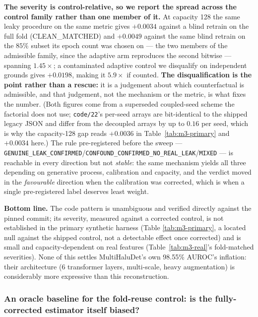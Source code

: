 \documentclass[10pt]{article} %
\begin{document}
\textbf{The severity is control-relative, so we report the spread across the
control family rather than one member of it.} At capacity 128 the same leaky
procedure on the same metric gives $+0.0034$ against a blind retrain on the
full fold (CLEAN\_MATCHED) and $+0.0049$ against the same blind retrain on the
$85\%$ subset its epoch count was chosen on --- the two members of the
admissible family, since the adaptive arm reproduces the second bitwise ---
spanning $1.45\times$; a contaminated adaptive control we disqualify on
independent grounds gives $+0.0198$, making it $5.9\times$ if counted.
\textbf{The disqualification is the point rather than a rescue:} it is a
judgement about which counterfactual is admissible, and that judgement, not the
mechanism or the metric, is what fixes the number. (Both figures come from a
superseded coupled-seed scheme the factorial does not use; \texttt{code/22}'s
per-seed arrays are bit-identical to the shipped legacy JSON and differ from
the decoupled arrays by up to $0.16$ per seed, which is why the capacity-128
gap reads $+0.0036$ in Table~\ref{tab:m3-primary} and $+0.0034$ here.) The rule
pre-registered before the sweep ---
\texttt{GENUINE\_LEAK\_CONFIRMED}/\texttt{CONFOUND\_CONFIRMED\_NO\_REAL\_LEAK}/\texttt{MIXED}
--- is reachable in every direction but not \emph{stable}: the same mechanism
yields all three depending on generative process, calibration and capacity, and
the verdict moved in the \emph{favourable} direction when the calibration was
corrected, which is when a single pre-registered label deserves least weight.

\textbf{Bottom line.} The code pattern is unambiguous and verified directly
against the pinned commit; its severity, measured against a corrected
control, is not established in the primary synthetic harness (Table
\ref{tab:m3-primary}, a located null against the shipped control, not a
detectable effect once corrected) and is small and capacity-dependent on real
features (Table~\ref{tab:m3-real}'s fold-matched severities). None of this
settles MultiHaluDet's own 98.55\% AUROC's inflation: their architecture (6
transformer layers, multi-scale, heavy augmentation) is considerably more
expressive than this reconstruction.

\subsubsection{An oracle baseline for the fold-reuse control: is the fully-corrected estimator itself biased?}
\label{sec:m3-oracle}
\end{document}
